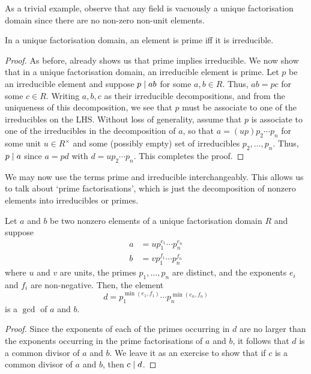 As a trivial example, observe that any field is vacuously a unique factorisation domain since there are no non-zero non-unit elements.

\begin{prop} \label{prop:UFD-prime-iff-irreducible}
In a unique factorisation domain, an element is prime iff it is irreducible.
\end{prop}
\begin{proof}
    As before,  already shows us that prime implies irreducible. We now show that in a unique factorisation domain, an irreducible element is prime. Let $p$ be an irreducible element and suppose $p \mid ab$ for some $a,b \in R$. Thus, $ab = pc$ for some $c \in R$. Writing $a,b,c$ as their irreducible decompositions, and from the uniqueness of this decomposition, we see that $p$ must be associate to one of the irreducibles on the LHS. Without loss of generality, assume that $p$ is associate to one of the irreducibles in the decomposition of $a$, so that $a = (up) p_2 \cdots p_n$ for some unit $u \in R^{\times}$ and some (possibly empty) set of irreducibles $p_2, \ldots, p_n$. Thus, $p \mid a$ since $a = pd$ with $d = u p_2 \cdots p_n$. This completes the proof.
\end{proof}

We may now use the terms prime and irreducible interchangeably. This allows us to talk about `prime factorisations', which is just the decomposition of nonzero elements into irreducibles or primes. 

\begin{prop}
    Let $a$ and $b$ be two nonzero elements of a unique factorisation domain $R$ and suppose 
    \begin{align*}
        a &= u p_1^{e_1} \cdots p_n^{e_n} \\
        b &= v p_1^{f_1} \cdots p_n^{f_n}
    \end{align*}
    where $u$ and $v$ are units, the primes $p_1, \ldots, p_n$ are distinct, and the exponents $e_i$ and $f_i$ are non-negative. Then, the element
    \[
        d = p_1^{\min(e_1, f_1)} \cdots p_n^{\min(e_n, f_n)}
    \]
    is a $\gcd$ of $a$ and $b$.
\end{prop}
\begin{proof}
    Since the exponents of each of the primes occurring in $d$ are no larger than the exponents occurring in the prime factorisations of $a$ and $b$, it follows that $d$ is a common divisor of $a$ and $b$. We leave it as an exercise to show that if $c$ is a common divisor of $a$ and $b$, then $c \mid d$.
\end{proof}

